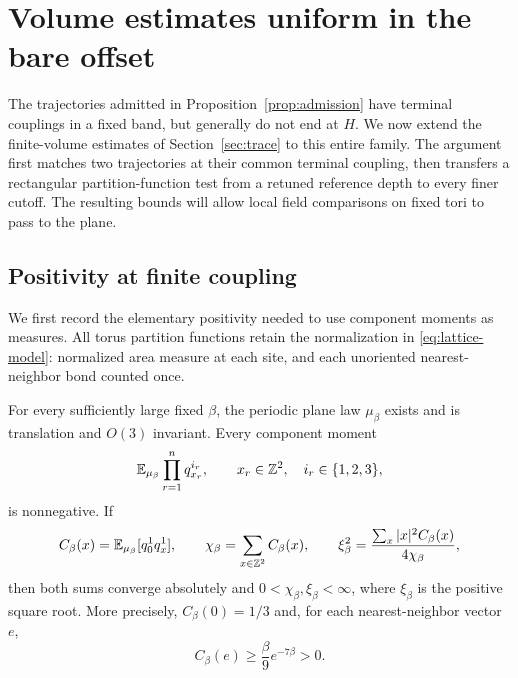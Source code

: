 \section{Volume estimates uniform in the bare offset}
\label{sec:volume}

The trajectories admitted in Proposition~\ref{prop:admission} have
terminal couplings in a fixed band, but generally do not end at $H$.
We now extend the finite-volume estimates of Section~\ref{sec:trace}
to this entire family.  The argument first matches two trajectories
at their common terminal coupling, then transfers a rectangular
partition-function test from a retuned reference depth to every finer
cutoff.  The resulting bounds will allow local field comparisons on
fixed tori to pass to the plane.

\subsection{Positivity at finite coupling}
\label{sec:finite-beta}

We first record the elementary positivity needed to use component
moments as measures.  All torus partition functions retain the
normalization in \eqref{eq:lattice-model}: normalized area measure at
each site, and each unoriented nearest-neighbor bond counted once.

\begin{lemma}
\label{lem:finite-beta}
For every sufficiently large fixed $\beta$, the periodic plane law
$\mu_\beta$ exists and is translation and $O(3)$ invariant.  Every
component moment
\[
 \mathbb E_{\mu_\beta}\prod_{r=1}^n q_{x_r}^{i_r},
 \qquad x_r\in\mathbb Z^2,\quad i_r\in\{1,2,3\},
\]
is nonnegative.  If
\[
 C_\beta(x)=\mathbb E_{\mu_\beta}[q_0^1q_x^1],\qquad
 \chi_\beta=\sum_{x\in\mathbb Z^2}C_\beta(x),\qquad
 \xi_\beta^2=\frac{\sum_x|x|^2C_\beta(x)}{4\chi_\beta},
\]
then both sums converge absolutely and
$0<\chi_\beta,\xi_\beta<\infty$, where $\xi_\beta$ is the positive
square root.  More precisely, $C_\beta(0)=1/3$ and, for each
nearest-neighbor vector $e$,
\begin{equation}
 C_\beta(e)\ge\frac{\beta}{9}e^{-7\beta}>0.
 \label{eq:offset-edge-positive}
\end{equation}
\end{lemma}

